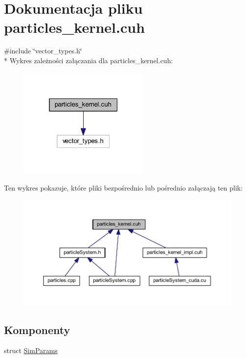 \hypertarget{particles__kernel_8cuh}{\section{Dokumentacja pliku particles\-\_\-kernel.\-cuh}
\label{particles__kernel_8cuh}
}
{\ttfamily \#include \char`\"{}vector\-\_\-types.\-h\char`\"{}}\\*
Wykres zależności załączania dla particles\-\_\-kernel.\-cuh\-:\nopagebreak
\begin{figure}[H]
\begin{center}
\leavevmode
\includegraphics[width=184pt]{particles__kernel_8cuh__incl}
\end{center}
\end{figure}
Ten wykres pokazuje, które pliki bezpośrednio lub pośrednio załączają ten plik\-:\nopagebreak
\begin{figure}[H]
\begin{center}
\leavevmode
\includegraphics[width=350pt]{particles__kernel_8cuh__dep__incl}
\end{center}
\end{figure}
\subsection*{Komponenty}
\begin{DoxyCompactItemize}
\item 
struct \hyperlink{struct_sim_params}{Sim\-Params}
\end{DoxyCompactItemize}
